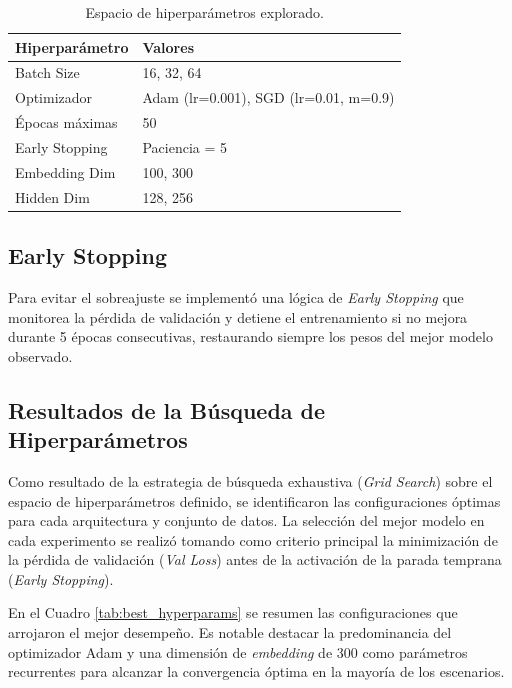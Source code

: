 \documentclass[12pt, a4paper]{article}
\begin{document}
\begin{table}[H]
    \centering
    \caption{Espacio de hiperparámetros explorado.}
    \label{tab:hyperparams}
    \begin{tabular}{ll}
        \toprule
        \textbf{Hiperparámetro} & \textbf{Valores}                     \\
        \midrule
        Batch Size              & 16, 32, 64                           \\
        Optimizador             & Adam (lr=0.001), SGD (lr=0.01, m=0.9)\\
        Épocas máximas          & 50                                   \\
        Early Stopping          & Paciencia = 5                        \\
        Embedding Dim           & 100, 300                             \\
        Hidden Dim              & 128, 256                             \\
        \bottomrule
    \end{tabular}
\end{table}

\subsection{Early Stopping}

Para evitar el sobreajuste se implementó una lógica de \textit{Early Stopping}
que monitorea la pérdida de validación y detiene el entrenamiento si no mejora
durante 5 épocas consecutivas, restaurando siempre los pesos del mejor modelo
observado.

\subsection{Resultados de la Búsqueda de Hiperparámetros}

Como resultado de la estrategia de búsqueda exhaustiva (\textit{Grid Search}) sobre el espacio de hiperparámetros definido, se identificaron las configuraciones óptimas para cada arquitectura y conjunto de datos. La selección del mejor modelo en cada experimento se realizó tomando como criterio principal la minimización de la pérdida de validación (\textit{Val Loss}) antes de la activación de la parada temprana (\textit{Early Stopping}).

En el Cuadro \ref{tab:best_hyperparams} se resumen las configuraciones que arrojaron el mejor desempeño. Es notable destacar la predominancia del optimizador Adam y una dimensión de \textit{embedding} de 300 como parámetros recurrentes para alcanzar la convergencia óptima en la mayoría de los escenarios.
\end{document}
